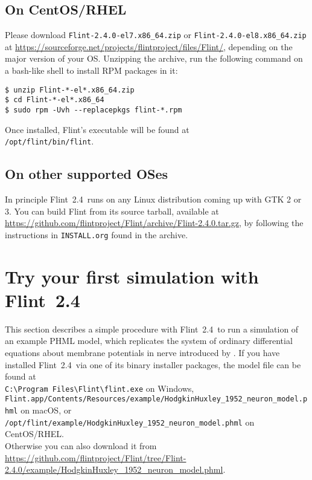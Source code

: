 \documentclass[a4paper,10pt]{report}
\def\FlintVersion{2.4}
\def\FlintLongVersion{2.4.0}
\def\Flint{Flint~\FlintVersion}
\def\FlintFilenamePrefix{Flint-\FlintLongVersion}
\newcommand{\filename}[1]{{\tt #1}}
\begin{document}
\subsection{On CentOS/RHEL}
Please download \filename{\FlintFilenamePrefix-el7.x86\_64.zip} or
\filename{\FlintFilenamePrefix-el8.x86\_64.zip}
at \url{https://sourceforge.net/projects/flintproject/files/Flint/}, depending
on the major version of your OS.
Unzipping the archive, run the following command on a bash-like shell to install
RPM packages in it:
\begin{verbatim}
$ unzip Flint-*-el*.x86_64.zip
$ cd Flint-*-el*.x86_64
$ sudo rpm -Uvh --replacepkgs flint-*.rpm
\end{verbatim}
Once installed, Flint's executable will be found at\\
\filename{/opt/flint/bin/flint}.

\subsection{On other supported OSes}
In principle \Flint\ runs on any Linux distribution coming up with GTK 2 or 3.
You can build Flint from its source tarball, available at
\url{https://github.com/flintproject/Flint/archive/\FlintFilenamePrefix.tar.gz},
by following the instructions in \filename{INSTALL.org} found in the archive.

\section{Try your first simulation with \Flint}
This section describes a simple procedure with \Flint\ to run a simulation of an
example PHML model, which replicates the system of ordinary differential
equations about membrane potentials in nerve introduced by
\cite{hodgkin_quantitative_1952}.
If you have installed \Flint\ via one of its binary installer packages, the
model file can be found at\\
\filename{C:\textbackslash Program Files\textbackslash Flint\textbackslash  flint.exe}
on Windows,\\
\filename{Flint.app/Contents/Resources/example/HodgkinHuxley\_1952\_neuron\_model.phml}
on macOS, or\\
\filename{/opt/flint/example/HodgkinHuxley\_1952\_neuron\_model.phml} on CentOS/RHEL.\\
Otherwise you can also download it from\\
\url{https://github.com/flintproject/Flint/tree/\FlintFilenamePrefix/example/HodgkinHuxley\_1952\_neuron\_model.phml}.
\end{document}
